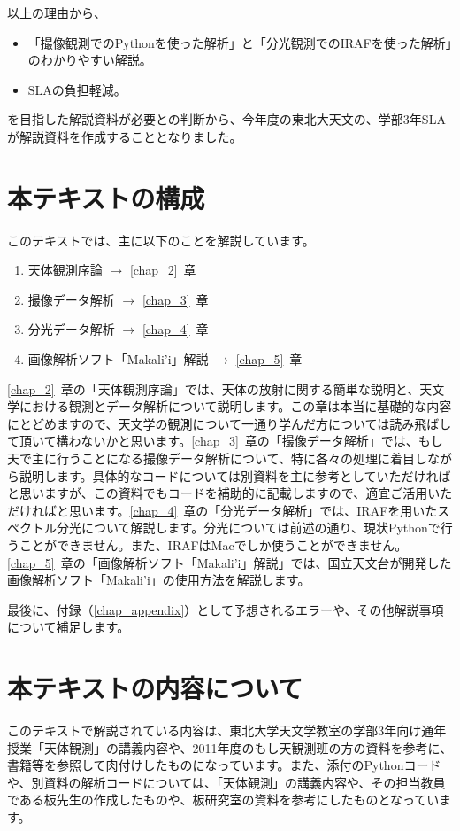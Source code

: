 以上の理由から、
\begin{itemize}
    \item 「撮像観測でのPythonを使った解析」と「分光観測でのIRAFを使った解析」のわかりやすい解説。
    \item SLAの負担軽減。
\end{itemize}
を目指した解説資料が必要との判断から、今年度の東北大天文の、学部3年SLAが解説資料を作成することとなりました。

\section{本テキストの構成}%
\label{sec_1_3}
このテキストでは、主に以下のことを解説しています。
\begin{enumerate}[1.]
    \item 天体観測序論 $\rightarrow$ \ref{chap_2}~章
    \item 撮像データ解析 $\rightarrow$ \ref{chap_3}~章
    \item 分光データ解析 $\rightarrow$ \ref{chap_4}~章
    \item 画像解析ソフト「Makali'i」解説 $\rightarrow$ \ref{chap_5}~章
\end{enumerate}

\ref{chap_2}~章の「天体観測序論」では、天体の放射に関する簡単な説明と、天文学における観測とデータ解析について説明します。この章は本当に基礎的な内容にとどめますので、天文学の観測について一通り学んだ方については読み飛ばして頂いて構わないかと思います。\ref{chap_3}~章の「撮像データ解析」では、もし天で主に行うことになる撮像データ解析について、特に各々の処理に着目しながら説明します。具体的なコードについては別資料を主に参考としていただければと思いますが、この資料でもコードを補助的に記載しますので、適宜ご活用いただければと思います。\ref{chap_4}~章の「分光データ解析」では、IRAFを用いたスペクトル分光について解説します。分光については前述の通り、現状Pythonで行うことができません。また、IRAFはMacでしか使うことができません。\ref{chap_5}~章の「画像解析ソフト「Makali'i」解説」では、国立天文台が開発した画像解析ソフト「Makali'i\cite{makali}」の使用方法を解説します。

最後に、付録（\ref{chap_appendix}）として予想されるエラーや、その他解説事項について補足します。

\section{本テキストの内容について}%
\label{sec_1_4}
このテキストで解説されている内容は、東北大学天文学教室の学部3年向け通年授業「天体観測」の講義内容や、2011年度のもし天観測班の方の資料を参考に、書籍等を参照して肉付けしたものになっています。また、添付のPythonコードや、別資料の解析コードについては、「天体観測」の講義内容や、その担当教員である板先生の作成したものや、板研究室の資料を参考にしたものとなっています。

